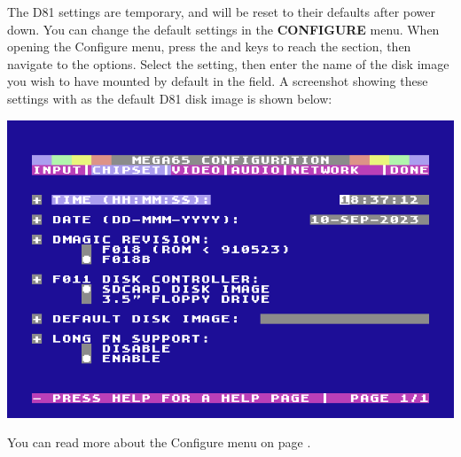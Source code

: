 The D81 settings are temporary, and will be reset to their defaults after power down. You can change the default settings
in the {\bf CONFIGURE} menu. When opening the Configure menu, press the  and  keys
to reach the  section, then navigate to the  options.
Select the  setting, then enter the name of the disk image you wish to have mounted
by default in the  field. A screenshot showing these settings with
 as the default D81 disk image is shown below:

\begin{center}
\includegraphics[width=0.7\linewidth]{images/ss-m65config-2.png}
\end{center}

You can read more about the Configure menu on page \pageref{sec:configuration-utility}.
